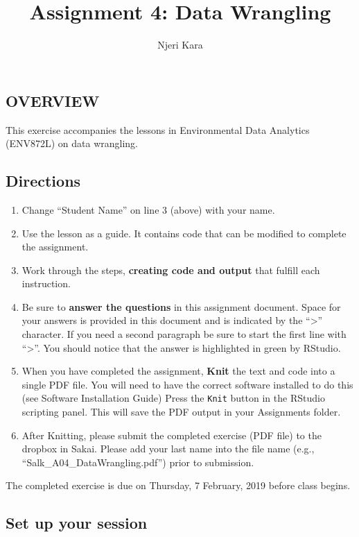\documentclass[]{article}
\title{Assignment 4: Data Wrangling}
\author{Njeri Kara}
\date{}
\providecommand{\tightlist}{%
  \setlength{\itemsep}{0pt}\setlength{\parskip}{0pt}}
\begin{document}
\maketitle

\subsection{OVERVIEW}\label{overview}

This exercise accompanies the lessons in Environmental Data Analytics
(ENV872L) on data wrangling.

\subsection{Directions}\label{directions}

\begin{enumerate}
\def\labelenumi{\arabic{enumi}.}
\tightlist
\item
  Change ``Student Name'' on line 3 (above) with your name.
\item
  Use the lesson as a guide. It contains code that can be modified to
  complete the assignment.
\item
  Work through the steps, \textbf{creating code and output} that fulfill
  each instruction.
\item
  Be sure to \textbf{answer the questions} in this assignment document.
  Space for your answers is provided in this document and is indicated
  by the ``\textgreater{}'' character. If you need a second paragraph be
  sure to start the first line with ``\textgreater{}''. You should
  notice that the answer is highlighted in green by RStudio.
\item
  When you have completed the assignment, \textbf{Knit} the text and
  code into a single PDF file. You will need to have the correct
  software installed to do this (see Software Installation Guide) Press
  the \texttt{Knit} button in the RStudio scripting panel. This will
  save the PDF output in your Assignments folder.
\item
  After Knitting, please submit the completed exercise (PDF file) to the
  dropbox in Sakai. Please add your last name into the file name (e.g.,
  ``Salk\_A04\_DataWrangling.pdf'') prior to submission.
\end{enumerate}

The completed exercise is due on Thursday, 7 February, 2019 before class
begins.

\subsection{Set up your session}\label{set-up-your-session}
\end{document}
